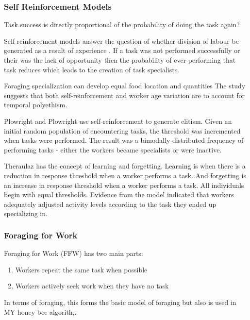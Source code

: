 \subsubsection{Self Reinforcement Models}
Task success is directly proportional of the probability of doing the task again?

Self reinforcement models answer the question of whether division of labour be generated as a result of experience \cite{lerman2005review}. If a task was not performed successfully or their was the lack of opportunity then the probability of ever performing that task reduces which leads to the creation of task specialists. 

Foraging specialization can develop equal food location and quantities \cite{deneubourg1987self} %
The study suggests that both self-reinforcement and worker age variation are to account for temporal polyethism. 

Plowright and Plowright \cite{plowright1988elitism} use self-reinforcement to generate elitism. Given an initial random population of encountering tasks, the threshold was incremented when tasks were performed. The result was a bimodally distributed frequency of performing tasks - either the workers became specialists or were inactive. 

Theraulaz \cite{theraulaz1998response} has the concept of learning and forgetting. Learning is when there is a reduction in response threshold when a worker performs a task. And forgetting is an increase in response threshold when a worker performs a task. All individuals begin with equal thresholds. Evidence from the model indicated that workers adequately adjusted activity levels according to the task they ended up specializing in. %

\subsubsection{Foraging for Work}
Foraging for Work (FFW) has two main parts:
\begin{enumerate}
	\item Workers repeat the same task when possible
	\item Workers actively seek work when they have no task
\end{enumerate}

In terms of foraging, this forms the basic model of foraging but also is used in MY honey bee algorith,. 

